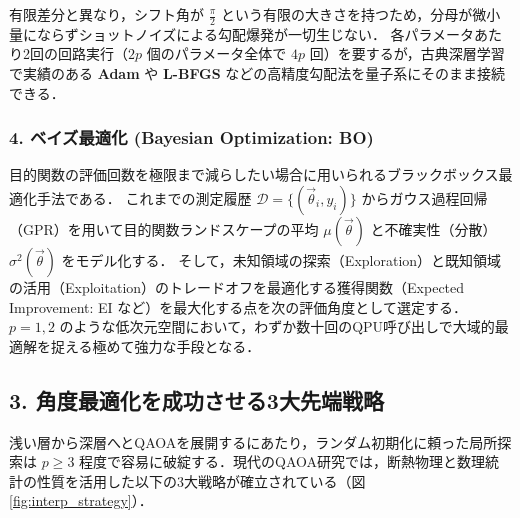 \documentclass[11pt,a4paper,oneside,openany]{ltjsbook}
\theoremstyle{definition}
\theoremstyle{plain}
\theoremstyle{remark}
\begin{document}
有限差分と異なり，シフト角が $\frac{\pi}{2}$ という有限の大きさを持つため，分母が微小量にならずショットノイズによる勾配爆発が一切生じない．
各パラメータあたり2回の回路実行（$2p$ 個のパラメータ全体で $4p$ 回）を要するが，古典深層学習で実績のある \textbf{Adam} や \textbf{L-BFGS} などの高精度勾配法を量子系にそのまま接続できる．

\subsubsection*{4. ベイズ最適化 (Bayesian Optimization: BO)}
目的関数の評価回数を極限まで減らしたい場合に用いられるブラックボックス最適化手法である．
これまでの測定履歴 $\mathcal{D} = \{(\vec{\theta}_i, y_i)\}$ からガウス過程回帰（GPR）を用いて目的関数ランドスケープの平均 $\mu(\vec{\theta})$ と不確実性（分散）$\sigma^2(\vec{\theta})$ をモデル化する．
そして，未知領域の探索（Exploration）と既知領域の活用（Exploitation）のトレードオフを最適化する獲得関数（Expected Improvement: EI など）を最大化する点を次の評価角度として選定する．
$p=1, 2$ のような低次元空間において，わずか数十回のQPU呼び出しで大域的最適解を捉える極めて強力な手段となる．

\subsection{3. 角度最適化を成功させる3大先端戦略}
浅い層から深層へとQAOAを展開するにあたり，ランダム初期化に頼った局所探索は $p \ge 3$ 程度で容易に破綻する．現代のQAOA研究では，断熱物理と数理統計の性質を活用した以下の3大戦略が確立されている（図 \ref{fig:interp_strategy}）．
\end{document}
